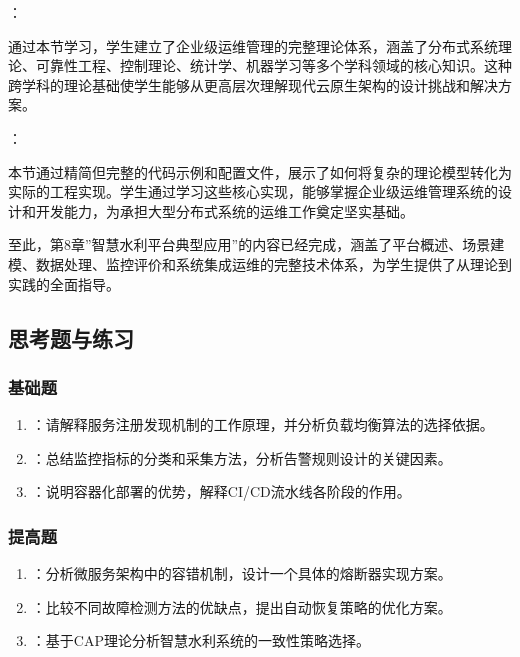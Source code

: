 ：

通过本节学习，学生建立了企业级运维管理的完整理论体系，涵盖了分布式系统理论、可靠性工程、控制理论、统计学、机器学习等多个学科领域的核心知识。这种跨学科的理论基础使学生能够从更高层次理解现代云原生架构的设计挑战和解决方案。

：

本节通过精简但完整的代码示例和配置文件，展示了如何将复杂的理论模型转化为实际的工程实现。学生通过学习这些核心实现，能够掌握企业级运维管理系统的设计和开发能力，为承担大型分布式系统的运维工作奠定坚实基础。

至此，第8章''智慧水利平台典型应用''的内容已经完成，涵盖了平台概述、场景建模、数据处理、监控评价和系统集成运维的完整技术体系，为学生提供了从理论到实践的全面指导。

\hypertarget{ux601dux8003ux9898ux4e0eux7ec3ux4e60-3}{%
\subsection{思考题与练习}\label{ux601dux8003ux9898ux4e0eux7ec3ux4e60-3}}

\hypertarget{ux57faux7840ux9898-3}{%
\subsubsection{基础题}\label{ux57faux7840ux9898-3}}

\begin{enumerate}
\def\labelenumi{\arabic{enumi}.}
\tightlist
\item
  ：请解释服务注册发现机制的工作原理，并分析负载均衡算法的选择依据。
\item
  ：总结监控指标的分类和采集方法，分析告警规则设计的关键因素。
\item
  ：说明容器化部署的优势，解释CI/CD流水线各阶段的作用。
\end{enumerate}

\hypertarget{ux63d0ux9ad8ux9898-3}{%
\subsubsection{提高题}\label{ux63d0ux9ad8ux9898-3}}

\begin{enumerate}
\def\labelenumi{\arabic{enumi}.}
\tightlist
\item
  ：分析微服务架构中的容错机制，设计一个具体的熔断器实现方案。
\item
  ：比较不同故障检测方法的优缺点，提出自动恢复策略的优化方案。
\item
  ：基于CAP理论分析智慧水利系统的一致性策略选择。
\end{enumerate}

